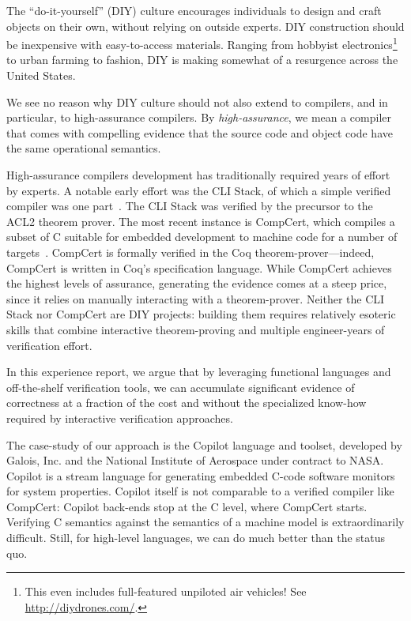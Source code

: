 \documentclass[9pt]{sigplanconf}
\begin{document}

The ``do-it-yourself'' (DIY) culture encourages individuals to design and craft
objects on their own, without relying on outside experts.  DIY construction
should be inexpensive with easy-to-access materials.  Ranging from hobbyist
electronics\footnote{This even includes full-featured unpiloted air vehicles!
  See \url{http://diydrones.com/}.} to urban farming to fashion, DIY is making
somewhat of a resurgence across the United States.

We see no reason why DIY culture should not also extend to compilers, and in
particular, to high-assurance compilers.  By \emph{high-assurance}, we mean a
compiler that comes with compelling evidence that the source code and object
code have the same operational semantics.

High-assurance compilers development has traditionally required years of effort
by experts.  A notable early effort was the CLI Stack, of which a simple
verified compiler was one part~\cite{cli}.  The CLI Stack was verified by the
precursor to the ACL2 theorem prover.  The most recent instance is CompCert,
which compiles a subset of C suitable for embedded development to machine code
for a number of targets~\cite{leroy}.  CompCert is formally verified in the Coq
theorem-prover---indeed, CompCert is written in Coq's specification language.
While CompCert achieves the highest levels of assurance, generating the evidence
comes at a steep price, since it relies on manually interacting with a
theorem-prover.  Neither the CLI Stack nor CompCert are DIY projects:
building them requires relatively esoteric skills that combine interactive
theorem-proving and multiple engineer-years of verification effort.

In this experience report, we argue that by leveraging functional languages and
off-the-shelf verification tools, we can accumulate significant evidence of
correctness at a fraction of the cost and without the specialized know-how
required by interactive verification approaches.  

The case-study of our approach is the Copilot language and toolset, developed by
Galois, Inc. and the National Institute of Aerospace under contract to NASA.
Copilot is a stream language for generating embedded C-code software monitors
for system properties.  Copilot itself is not comparable to a verified compiler
like CompCert: Copilot back-ends stop at the C level, where CompCert starts.
Verifying C semantics against the semantics of a machine model is
extraordinarily difficult.  Still, for high-level languages, we can do much
better than the status quo.
\end{document}

